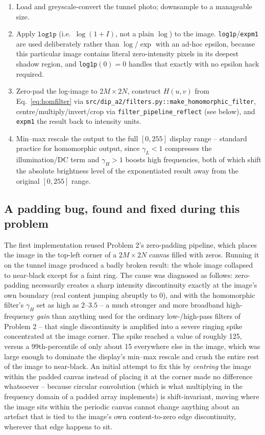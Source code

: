 \documentclass[11pt]{article}
\begin{document}
\begin{enumerate}[leftmargin=1.5em]
  \item Load and greyscale-convert the tunnel photo; downsample to a manageable size.
  \item Apply $\texttt{log1p}$ (i.e.\ $\log(1+I)$, not a plain $\log$) to the image.
  \texttt{log1p}/\texttt{expm1} are used deliberately rather than $\log$/$\exp$ with an
  ad-hoc epsilon, because this particular image contains literal zero-intensity pixels
  in its deepest shadow region, and \texttt{log1p}$(0)=0$ handles that exactly with no
  epsilon hack required.
  \item Zero-pad the log-image to $2M\times 2N$, construct $H(u,v)$ from
  Eq.~\eqref{eq:homfilter} via \texttt{src/dip\_a2/filters.py::make\_homomorphic\_filter},
  centre/multiply/invert/crop via \texttt{filter\_pipeline\_reflect} (see below), and
  \texttt{expm1} the result back to intensity units.
  \item Min--max rescale the output to the full $[0,255]$ display range -- standard
  practice for homomorphic output, since $\gamma_L<1$ compresses the illumination/DC
  term and $\gamma_H>1$ boosts high frequencies, both of which shift the absolute
  brightness level of the exponentiated result away from the original $[0,255]$ range.
\end{enumerate}

\subsection{A padding bug, found and fixed during this problem}

The first implementation reused Problem 2's zero-padding pipeline, which places the
image in the top-left corner of a $2M\times 2N$ canvas filled with zeros. Running it on
the tunnel image produced a badly broken result: the whole image collapsed to near-black
except for a faint ring. The cause was diagnosed as follows: zero-padding necessarily
creates a sharp intensity discontinuity exactly at the image's own boundary (real content
jumping abruptly to 0), and with the homomorphic filter's $\gamma_H$ set as high as
$2$--$3.5$ -- a much stronger and more broadband high-frequency \emph{gain} than anything
used for the ordinary low-/high-pass filters of Problem 2 -- that single discontinuity is
amplified into a severe ringing spike concentrated at the image corner. The spike reached
a value of roughly 125, versus a 99th-percentile of only about 15 everywhere else in the
image, which was large enough to dominate the display's min--max rescale and crush the
entire rest of the image to near-black. An initial attempt to fix this by \emph{centring}
the image within the padded canvas instead of placing it at the corner made no
difference whatsoever -- because circular convolution (which is what multiplying in the
frequency domain of a padded array implements) is shift-invariant, moving where the image
sits within the periodic canvas cannot change anything about an artefact that is tied to
the image's own content-to-zero edge discontinuity, wherever that edge happens to sit.
\end{document}
